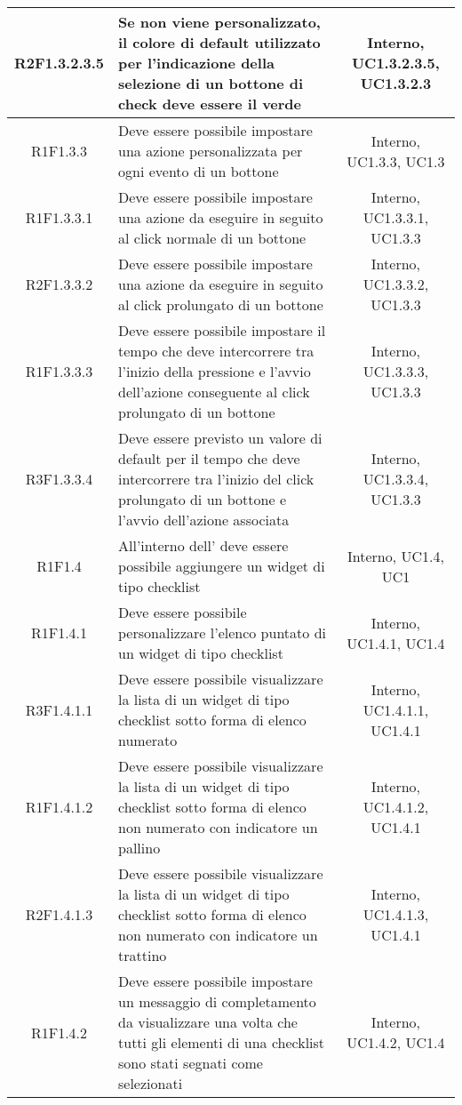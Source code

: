 \begin{longtable}{|c|>{\centering}m{7cm}|c|}
		\hline
		R2F1.3.2.3.5 & Se non viene personalizzato, il colore di default utilizzato per l'indicazione della selezione di un bottone di check deve essere il verde & Interno, UC1.3.2.3.5, UC1.3.2.3 \\
		\hline
			R1F1.3.3 & Deve essere possibile impostare una azione personalizzata per ogni evento di un bottone & Interno, UC1.3.3, UC1.3 \\
			\hline
		R1F1.3.3.1 & Deve essere possibile impostare una azione da eseguire in seguito al click normale di un bottone & Interno, UC1.3.3.1, UC1.3.3\\ 
		\hline
		R2F1.3.3.2 & Deve essere possibile impostare una azione da eseguire in seguito al click prolungato di un bottone & Interno, UC1.3.3.2, UC1.3.3\\ 
		\hline
		R1F1.3.3.3 & Deve essere possibile impostare il tempo che deve intercorrere tra l'inizio della pressione e l'avvio dell'azione conseguente al click prolungato di un bottone & Interno, UC1.3.3.3, UC1.3.3\\ 
		\hline
		R3F1.3.3.4 & Deve essere previsto un valore di default per il tempo che deve intercorrere tra l'inizio del click prolungato di un bottone e l'avvio dell'azione associata & Interno, UC1.3.3.4, UC1.3.3\\ 
		\hline
		R1F1.4 & All'interno dell'\termine{SDK} deve essere possibile aggiungere un widget di tipo checklist & Interno, UC1.4, UC1 \\ 
		\hline
		R1F1.4.1 & Deve essere possibile personalizzare l'elenco puntato di un widget di tipo checklist & Interno, UC1.4.1, UC1.4 \\
		\hline
		R3F1.4.1.1 & Deve essere possibile visualizzare la lista di un widget di tipo checklist sotto forma di elenco numerato & Interno, UC1.4.1.1, UC1.4.1 \\
		\hline
		R1F1.4.1.2 & Deve essere possibile visualizzare la lista di un widget di tipo checklist sotto forma di elenco non numerato con indicatore un pallino & Interno, UC1.4.1.2, UC1.4.1 \\
		\hline
		R2F1.4.1.3 & Deve essere possibile visualizzare la lista di un widget di tipo checklist sotto forma di elenco non numerato con indicatore un trattino & Interno, UC1.4.1.3, UC1.4.1 \\
		\hline
		R1F1.4.2 & Deve essere possibile impostare un messaggio di completamento da visualizzare una volta che tutti gli elementi di una checklist sono stati segnati come selezionati & Interno, UC1.4.2, UC1.4 \\

\end{longtable}
